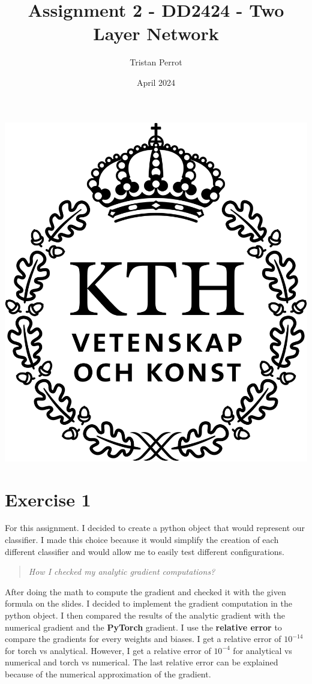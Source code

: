 \documentclass{article}
\title{Assignment 2 - DD2424 - Two Layer Network}
\author{Tristan Perrot}
\date{April 2024}
\begin{document}
\maketitle
\begin{center}
    \includegraphics[scale=0.25]{images/KTH_logo_RGB_svart.png}
\end{center}

\section{Exercise 1}

For this assignment. I decided to create a python object that would represent our classifier. I made this choice because it would simplify the creation of each different classifier and would allow me to easily test different configurations.
\begin{quote}
    \textit{How I checked my analytic gradient computations?}
\end{quote}
After doing the math to compute the gradient and checked it with the given formula on the slides. I decided to implement the gradient computation in the python object. I then compared the results of the analytic gradient with the numerical gradient and the \textbf{PyTorch} gradient.
I use the \textbf{relative error} to compare the gradients for every weights and biases. I get a relative error of $10^{-14}$ for torch vs analytical. However, I get a relative error of $10^{-4}$ for analytical vs numerical and torch vs numerical. The last relative error can be explained because of the numerical approximation of the gradient.
\end{document}
